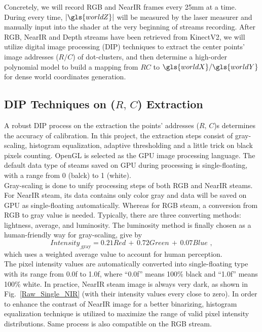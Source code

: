 %
Concretely, we will record RGB and \gls{NearIR} frames every 25mm at a time. During every time, \(|\gls{worldZ}|\) will be measured by the laser measurer and manually input into the shader at the very beginning of streams recording. After RGB, \gls{NearIR} and Depth streams have been retrieved from \gls{KinectV2}, we will utilize digital image processing (\gls{DIP}) techniques to extract the center points' image addresses (\(R/C\)) of dot-clusters, and then determine a high-order polynomial model to build a mapping from \(RC\) to \(\gls{worldX}/\gls{worldY}\) for dense world coordinates generation.

\subsection{\gls{DIP} Techniques on (\(R,\, C\)) Extraction}
\label{sectionDIPTechniques}
\indent
A robust \gls{DIP} process on the extraction the points' addresses (\(R,\, C\))s determines the accuracy of calibration. In this project, the extraction steps consist of gray-scaling, histogram equalization, adaptive thresholding and a little trick on black pixels counting. OpenGL is selected as the \gls{GPU} image processing language. The default data type of steams saved on \gls{GPU} during processing is single-floating, with a range from 0 (balck) to 1 (white). 
\\\indent
Gray-scaling is done to unify processing steps of both RGB and \gls{NearIR} steams. For \gls{NearIR} steam, its data contains only color gray and data will be saved on \gls{GPU} as single-floating automatically. Whereas for RGB steam, a conversion from RGB to gray value is needed. Typically, there are three converting methods: lightness, average, and luminosity. The luminosity method is finally chosen as a human-friendly way for gray-scaling, give by
%
\begin{equation}
Intensity_{\text{\_gray}} =  0.21 Red\,  + \, 0.72 Green \, + \, 0.07 Blue  \, \, ,
\label{luminosityGrayScaling}
\end{equation}%
which uses a weighted average value to account for human perception.
\\\indent%
The pixel intensity values are automatically converted into single-floating type with its range from 0.0f to 1.0f, where \enquote{0.0f} means 100\% black and \enquote{1.0f}  means 100\% white. In practice, \gls{NearIR} steam image is always very dark, as shown in Fig.~\ref{Raw_Single_NIR} (with their intensity values every close to zero).  In order to enhance the contrast of \gls{NearIR} image for a better binarizing, histogram equalization technique is utilized to maximize the range of valid pixel intensity distributions. Same process is also compatible on the RGB stream.
